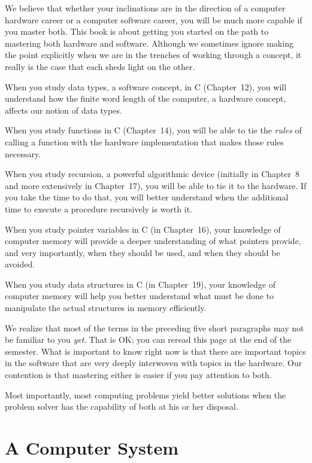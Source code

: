 \documentclass{patt}
\begin{document}
We believe that whether your inclinations are in the direction of a computer
hardware career or a computer software career, you will be much
more capable if you master both.  This book is about getting you started on 
the path to mastering both hardware and software.  Although we sometimes 
ignore making the point explicitly when we are in the trenches of working 
through a concept, it really is the case that each sheds light on the other.

When you study data types, a software concept, in C (Chapter~12), you
will understand how the finite word length of the computer, a hardware
concept, affects our notion of data types.

When you study functions in C (Chapter~14), you will be able to tie
the {\em rules} of calling a function with the
hardware implementation that makes those rules necessary.

When you study recursion, a powerful algorithmic device (initially in 
Chapter~8 and more extensively in
Chapter~17), you will be able to tie it to the hardware.  If you take the 
time to do that, you will better understand when the additional time to 
execute a procedure recursively is worth it.

When you study pointer variables in C (in Chapter~16), your knowledge of
computer memory will provide a deeper understanding of what pointers provide,
and very importantly, when they should be used, and when 
they should be avoided.

When you study data structures in C (in Chapter~19), your knowledge of
computer memory will help you better understand
what must be done to manipulate the actual structures in memory efficiently.

We realize that most of the terms in the preceding five short paragraphs
may not be familiar to you {\em yet}.  That is OK; you can reread this page
at the end of
the semester.  What is important to know right now is that there are important
topics in the software that are very deeply interwoven with topics in the
hardware.  Our contention is that mastering either is easier if you pay
attention to both.

Most importantly, most computing problems yield better solutions when the 
problem solver has the capability of both at his or her disposal.

\section{A Computer System}
\end{document}
